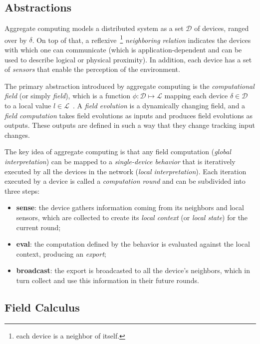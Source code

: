 \documentclass[12pt,a4paper,openright,twoside]{book}
\begin{document}
\subsection{Abstractions}
\label{subsection:abstractions}

Aggregate computing models a distributed system as a set $\mathcal{D}$ of devices, ranged over by $\delta$. On top of that, a reflexive~\footnote{each device is a neighbor of itself.} \textit{neighboring relation} indicates the devices with which one can communicate (which is application-dependent and can be used to describe logical or physical proximity). In addition, each device has a set of \textit{sensors} that enable the perception of the environment.

The primary abstraction introduced by aggregate computing is the \textit{computational field} (or simply \textit{field}), which is a function $\phi: \mathcal{D} \mapsto \mathcal{L}$ mapping each device $\delta \in \mathcal{D}$ to a local value $l \in \mathcal{L}$~\cite{Viroli2018}.
%
A \textit{field evolution} is a dynamically changing field, and a \textit{field computation} takes field evolutions as inputs and produces field evolutions as outputs.
%
These outputs are defined in such a way that they change tracking input changes.

The key idea of aggregate computing is that any field computation (\textit{global interpretation}) can be mapped to a \textit{single-device behavior} that is iteratively executed by all the devices in the network (\textit{local interpretation}).
%
Each iteration executed by a device is called a \textit{computation round} and can be subdivided into three steps:
%
\begin{itemize}
    \item \textbf{sense}: the device gathers information coming from its neighbors and local sensors, which are collected to create its \textit{local context} (or \textit{local state}) for the current round;
    \item \textbf{eval}: the computation defined by the behavior is evaluated against the local context, producing an \textit{export};
    \item \textbf{broadcast}: the export is broadcasted to all the device's neighbors, which in turn collect and use this information in their future rounds.
\end{itemize}

\subsection{Field Calculus}
\label{subsection:field-calculus}
\end{document}
